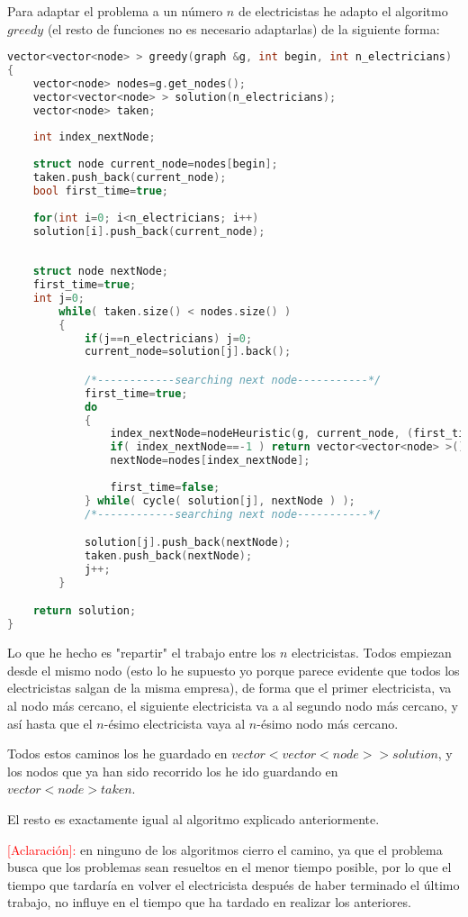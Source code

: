 \documentclass[11pt]{article}
\begin{document}
Para adaptar el problema a un número $n$ de electricistas he adapto el algoritmo $greedy$ (el resto de funciones no es necesario adaptarlas) de la siguiente forma:
\begin{lstlisting}[language=C++, caption=Adaptación del algoritmo]
vector<vector<node> > greedy(graph &g, int begin, int n_electricians)
{
	vector<node> nodes=g.get_nodes();
	vector<vector<node> > solution(n_electricians);
	vector<node> taken;
	
	int index_nextNode;
	
	struct node current_node=nodes[begin];
	taken.push_back(current_node);
	bool first_time=true;
	
	for(int i=0; i<n_electricians; i++)
	solution[i].push_back(current_node);
	
	
	struct node nextNode;
	first_time=true;
	int j=0;
		while( taken.size() < nodes.size() )
		{
			if(j==n_electricians) j=0;
			current_node=solution[j].back();

			/*------------searching next node-----------*/
			first_time=true;
			do
			{
				index_nextNode=nodeHeuristic(g, current_node, (first_time)? 0:g.get_weight(current_node.label, nextNode.label), taken);
				if( index_nextNode==-1 ) return vector<vector<node> >();
				nextNode=nodes[index_nextNode];
				
				first_time=false;
			} while( cycle( solution[j], nextNode ) );
			/*------------searching next node-----------*/

			solution[j].push_back(nextNode);
			taken.push_back(nextNode);
			j++;
		}

	return solution;
}
\end{lstlisting}

Lo que he hecho es "repartir" el trabajo entre los $n$ electricistas. Todos empiezan desde el mismo nodo (esto lo he supuesto yo porque parece evidente que todos los electricistas salgan de la misma empresa), de forma que el primer electricista, va al nodo más cercano, el siguiente electricista va a al segundo nodo más cercano, y así hasta que el $n$-ésimo electricista vaya al $n$-ésimo nodo más cercano.

Todos estos caminos los he guardado en $vector<vector<node> > solution$, y los nodos que ya han sido recorrido los he ido guardando en $vector<node> taken$.

El resto es exactamente igual al algoritmo explicado anteriormente.


\hfill \break

\textcolor{red}{[Aclaración]:} en ninguno de los algoritmos cierro el camino, ya que el problema busca que los problemas sean resueltos en el menor tiempo posible, por lo que el tiempo que tardaría en volver el electricista después de haber terminado el último trabajo, no influye en el tiempo que ha tardado en realizar los anteriores.
\end{document}

